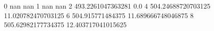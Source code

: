 0 nan nan
1 nan nan
2 493.2261047363281 0.0
4 504.24688720703125 11.020782470703125
6 504.915771484375 11.689666748046875
8 505.62982177734375 12.403717041015625
